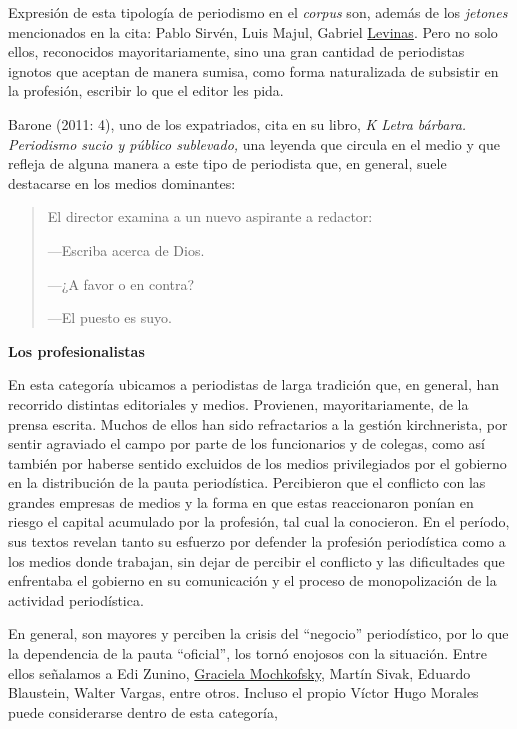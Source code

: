 Expresión de esta tipología de periodismo en el \emph{corpus} son, además de los \emph{jetones} mencionados en la cita: Pablo Sirvén, Luis Majul, Gabriel \href{http://www.edicionesb-argentina.com/autor/levinas-daniel/}{Levinas}. Pero no solo ellos, reconocidos mayoritariamente, sino una gran cantidad de periodistas ignotos que aceptan de manera sumisa, como forma naturalizada de subsistir en la profesión, escribir lo que el editor les pida.

Barone (2011: 4), uno de los expatriados, cita en su libro, \emph{K Letra bárbara. Periodismo sucio y público sublevado,} una leyenda que circula en el medio y que refleja de alguna manera a este tipo de periodista que, en general, suele destacarse en los medios dominantes:

\begin{quote}
El director examina a un nuevo aspirante a redactor:

---Escriba acerca de Dios.

---¿A favor o en contra?

---El puesto es suyo.
\end{quote}

\textbf{Los profesionalistas}

En esta categoría ubicamos a periodistas de larga tradición que, en general, han recorrido distintas editoriales y medios. Provienen, mayoritariamente, de la prensa escrita. Muchos de ellos han sido refractarios a la gestión kirchnerista, por sentir agraviado el campo por parte de los funcionarios y de colegas, como así también por haberse sentido excluidos de los medios privilegiados por el gobierno en la distribución de la pauta periodística. Percibieron que el conflicto con las grandes empresas de medios y la forma en que estas reaccionaron ponían en riesgo el capital acumulado por la profesión, tal cual la conocieron. En el período, sus textos revelan tanto su esfuerzo por defender la profesión periodística como a los medios donde trabajan, sin dejar de percibir el conflicto y las dificultades que enfrentaba el gobierno en su comunicación y el proceso de monopolización de la actividad periodística.

En general, son mayores y perciben la crisis del ``negocio'' periodístico, por lo que la dependencia de la pauta ``oficial'', los tornó enojosos con la situación. Entre ellos señalamos a Edi Zunino, \href{http://www.tematika.com/buscar.do?seccionDeBusqueda=En+Libros\&seccion=1\&claveDeBusqueda=porAutor\&txtencoded=Graciela+Mochkofsky\&idAutor=35432\&criterioDeOrden=2\&idSeccion=1\&texto=Graciela+Mochkofsky\&optSeleccionada=Autor\&idSeccionPropia=1}{Graciela Mochkofsky}, Martín Sivak, Eduardo Blaustein, Walter Vargas, entre otros. Incluso el propio Víctor Hugo Morales puede considerarse dentro de esta categoría,

